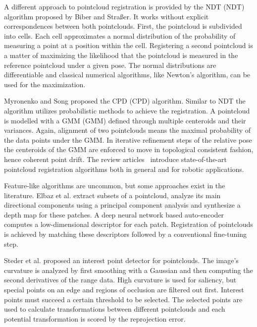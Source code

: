 A different approach to pointcloud registration is provided by the \acrlong{NDT} (\acrshort{NDT}) algorithm proposed by Biber and Straßer\cite{biber_iros2003}.
It works without explicit correspondences between both pointclouds.
First, the pointcloud is subdivided into cells.
Each cell approximates a normal distribution of the probability of measuring a point at a position within the cell.
Registering a second pointcloud is a matter of maximizing the likelihood that the pointcloud is measured in the reference pointcloud under a given pose.
The normal distributions are differentiable and classical numerical algorithms, like Newton's algorithm, can be used for the maximization.

Myronenko and Song\cite{myronenko_ieee2010} proposed the \acrlong{CPD} (\acrshort{CPD}) algorithm.
Similar to \acrshort{NDT} the algorithm utilizes probabilistic methods to achieve the registration.
A pointcloud is modelled with a \acrlong{GMM} (\acrshort{GMM}) defined through multiple centeroids and their variances.
Again, alignment of two pointclouds means the maximal probability of the data points under the \acrshort{GMM}.
In iterative refinement steps of the relative pose the centeroids of the \acrshort{GMM} are enforced to move in topological consistent fashion, hence coherent point drift.
The review articles~\cite{bellekens_ambient2014,pomerleau_2015} introduce state-of-the-art pointcloud registration algorithms both in general and for robotic applications.

Feature-like algorithms are uncommon, but some approaches exist in the literature.
Elbaz et al.\cite{elbaz_cvpr2017} extract subsets of a pointcloud, analyze its main directional components using a principal component analysis and synthesize a depth map for these patches.
A deep neural network based auto-encoder computes a low-dimensional descriptor for each patch.
Registration of pointclouds is achieved by matching these descriptors followed by a conventional fine-tuning step.

Steder et al.\cite{steder_robot2010} proposed an interest point detector for pointclouds.
The image's curvature is analyzed by first smoothing with a Gaussian and then computing the second derivatives of the range data.
High curvature is used for saliency, but special points on an edge and regions of occlusion are filtered out first.
Interest points must succeed a certain threshold to be selected.
The selected points are used to calculate transformations between different pointclouds and each potential transformation is scored by the reprojection error.

